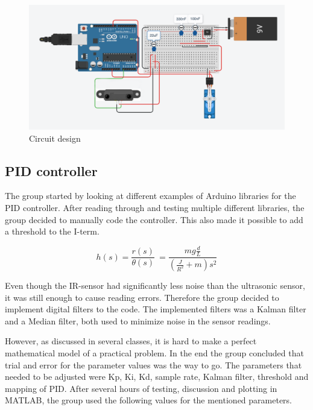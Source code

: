 \begin{figure}[h]
    \centering
    \includegraphics[width = 1\textwidth]{Images/Circuit-snip.png}
    \caption{Circuit design}
    \label{fig:Circuit design}
\end{figure}

\subsection{PID controller}


The group started by looking at different examples of Arduino libraries for the PID controller. After reading through and testing multiple different libraries, the group decided to manually code the controller. This also made it possible to add a threshold to the I-term.

\begin{equation}
    h(s) = \frac{r(s)}{\theta(s)}\ = \frac{mg\frac{d}{L}}{(\frac{J}{R^2}+m)s^2}
\end{equation}

Even though the IR-sensor had significantly less noise than the ultrasonic sensor, it was still enough to cause reading errors. Therefore the group decided to implement digital filters to the code. The implemented filters was a Kalman filter and a Median filter, both used to minimize noise in the sensor readings. 

However, as discussed in several classes, it is hard to make a perfect mathematical model of a practical problem. In the end the group concluded that trial and error for the parameter values was the way to go. The parameters that needed to be adjusted were Kp, Ki, Kd, sample rate, Kalman filter, threshold and mapping of PID. After several hours of testing, discussion and plotting in MATLAB, the group used the following values for the mentioned parameters.\\

